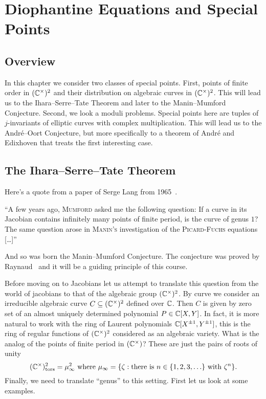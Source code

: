\chapter{Diophantine Equations and Special Points}

\section{Overview}

In this chapter we consider two classes of special points. First,
points of finite order in $({\mathbb{C}}^\times)^2$ and their distribution on
algebraic curves in $({\mathbb{C}}^\times)^2$. This will lead us to the
Ihara--Serre--Tate Theorem and later to the Manin--Mumford Conjecture.
Second, we look a moduli problems. Special points here are tuples of
$j$-invariants of elliptic curves with complex multiplication. This
will lead us to the Andr\'e--Oort Conjecture, but more specifically to
a theorem of Andr\'e and Edixhoven that treats the first interesting
case. 

\section{The Ihara--Serre--Tate Theorem}
\label{sec:ist}

Here's a quote from a paper of Serge Lang from
1965~\cite{Lang:Division}.

\begin{displayquote}
  ``A few years ago, \textsc{Mumford} asked me the following question:
  If a curve in its Jacobian contains infinitely many points of finite
  period, is the curve of genus $1$? The same question arose in
  \textsc{Manin's} investigation of the \textsc{Picard-Fuchs}
  equations [\ldots]''
\end{displayquote}
And so was born the Manin--Mumford Conjecture. The conjecture was
proved by Raynaud~\cite{Raynaud:MM} and it will be a guiding principle of this
course. 

Before moving on to Jacobians let us attempt to translate this question
from the world of jacobians to that  of the algebraic group $({\mathbb{C}}^\times)^2$. By
curve we consider an irreducible algebraic curve $C\subseteq
({\mathbb{C}}^\times)^2$ defined over ${\mathbb{C}}$. Then $C$ is given by zero set of
an almost uniquely determined polynomial $P\in {\mathbb{C}}[X,Y]$.
In fact, it is more natural to work with the ring of
Laurent polynomials ${\mathbb{C}}[X^{\pm 1},Y^{\pm 1}]$, this is the ring of
regular functions of $({\mathbb{C}}^\times)^2$ considered as an algebraic
variety.
What is the analog of the points of finite period in $({\mathbb{C}}^\times)$?
These are just the pairs of roots of unity
$$ ({\mathbb{C}}^\times)^2_{\mathrm{tors}}= \mu_\infty^2  \text{ where
}\mu_\infty = \{\zeta : \text{there is $n\in\{1,2,3,\ldots\}$
  with }\zeta^n \}.$$
Finally, we need to translate ``genus'' to this setting. First let us
look at some examples.


